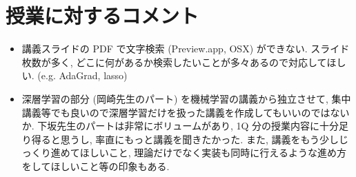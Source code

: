 \documentclass[a4paper,10pt]{jsarticle}
\begin{document}
\section*{授業に対するコメント}
\begin{itemize}
 \item 講義スライドの PDF で文字検索 (Preview.app, OSX) ができない.
       スライド枚数が多く, どこに何があるか検索したいことが多々あるので対応してほしい.
       (e.g. AdaGrad, lasso)
 \item 深層学習の部分 (岡崎先生のパート) を機械学習の講義から独立させて,
       集中講義等でも良いので深層学習だけを扱った講義を作成してもいいのではないか.
       下坂先生のパートは非常にボリュームがあり, 1Q 分の授業内容に十分足り得ると思うし,
       率直にもっと講義を聞きたかった.
       また, 講義をもう少しじっくり進めてほしいこと,
       理論だけでなく実装も同時に行えるような進め方をしてほしいこと等の印象もある.
\end{itemize}
\end{document}
